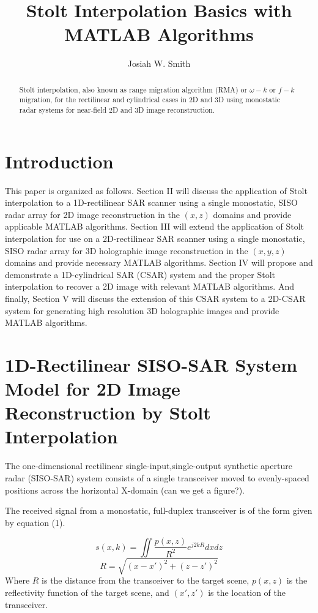 \documentclass{IEEEtran}
\title{Stolt Interpolation Basics with MATLAB Algorithms}
\author{Josiah W. Smith}
\begin{document}
\maketitle

\begin{abstract}

Stolt interpolation, also known as range migration algorithm (RMA) or $\omega-k$ or $f-k$ migration, for the rectilinear and cylindrical cases in 2D and 3D using monostatic radar systems for near-field 2D and 3D image reconstruction.

\end {abstract}

\section{Introduction}
This paper is organized as follows. Section II will discuss the application of Stolt interpolation to a 1D-rectilinear SAR scanner using a single monostatic, SISO radar array for 2D image reconstruction in the $(x,z)$ domains and provide applicable MATLAB algorithms. Section III will extend the application of Stolt interpolation for use on a 2D-rectilinear SAR scanner using a single monostatic, SISO radar array for 3D holographic image reconstruction in the $(x,y,z)$ domains and provide necessary MATLAB algorithms. Section IV will propose and demonstrate a 1D-cylindrical SAR (CSAR) system and the proper Stolt interpolation to recover a 2D image with relevant MATLAB algorithms. And finally, Section V will discuss the extension of this CSAR system to a 2D-CSAR system for generating high resolution 3D holographic images and provide MATLAB algorithms.

\section{1D-Rectilinear SISO-SAR System Model for 2D Image Reconstruction by Stolt Interpolation}
The one-dimensional rectilinear single-input,single-output synthetic aperture radar (SISO-SAR) system consists of a single transceiver moved to evenly-spaced positions across the horizontal X-domain (can we get a figure?).

The received signal from a monostatic, full-duplex transceiver is of the form given by equation (1).

\begin{equation}
	s(x,k) = \iint \frac{p(x,z)}{R^2} e^{j2kR}dxdz
\end{equation}
\begin{equation}
	R = \sqrt{ (x-x')^2 + (z-z')^2 }
\end{equation}
Where $R$ is the distance from the transceiver to the target scene, $p(x,z)$ is the reflectivity function of the target scene, and $(x',z')$ is the location of the transceiver.
\end{document}
